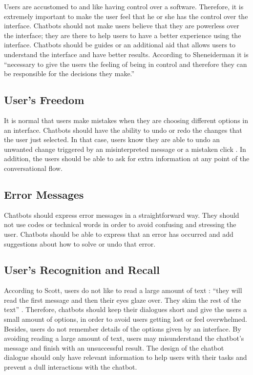 \documentclass[a4paper,10pt]{article}
\begin{document}
Users are accustomed to and like having control over a software. Therefore, it is extremely important to make the user feel that he or she has the control over the interface. Chatbots should not make users believe that they are powerless over the interface; they are there to help users to have a better experience using the interface. Chatbots should be guides or an additional aid that allows users to understand the interface and have better results. According to Sheneiderman \cite{shneiderman1997direct} it is ``necessary to give the users the feeling of being in control and therefore they can be responsible for the decisions they make.” 

\subsection*{User's Freedom}

It is normal that users make mistakes when they are choosing different options in an interface. Chatbots should have the ability to undo or redo the changes that the user just selected. In that case, users know they are able to undo an unwanted change triggered by an misinterpreted message or a mistaken click \cite{HeuristicsWebPage}. In addition, the users should be able to ask for extra information at any point of the conversational flow.

\subsection*{Error Messages}

Chatbots should express error messages in a straightforward way. They should not use codes or technical words in order to avoid confusing and stressing the user. Chatbots should be able to express that an error has occurred and add suggestions about how to solve or undo that error.  

\subsection*{User's Recognition and Recall}

According to Scott, users do not like to read a large amount of text : ``they will read the first message and then their eyes glaze over. They skim the rest of the text” \cite{HeuristicsWebPage}. Therefore, chatbots should keep their dialogues short and give the users a small amount of options, in order to avoid users getting lost or feel overwhelmed.
Besides, users do not remember details of the options given by an interface. By avoiding reading a large amount of text, users may misunderstand the chatbot’s message and finish with an unsuccessful result. The design of the chatbot dialogue should only have relevant information to help users with their tasks and prevent a dull interactions with the chatbot. 
\end{document}
